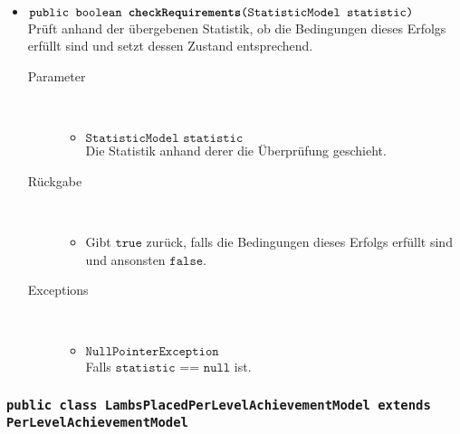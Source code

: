 \begin{description}
\begin{itemize}
		\item $\texttt{public boolean \textbf{checkRequirements}(StatisticModel statistic)}$ \\ Prüft anhand der übergebenen Statistik, ob die Bedingungen dieses Erfolgs erfüllt sind und setzt dessen Zustand entsprechend.
		\begin{description}
		\item[Parameter] \hfill \\
			\vspace{-.8cm}
			\begin{itemize}
				\item $\texttt{StatisticModel statistic}$ \\ Die Statistik anhand derer die Überprüfung geschieht. 
			\end{itemize}
			\item[Rückgabe] \hfill \\
			\vspace{-.8cm}
			\begin{itemize}
				\item Gibt $\texttt{true}$ zurück, falls die Bedingungen dieses Erfolgs erfüllt sind und ansonsten $\texttt{false}$.
			\end{itemize}
			\item[Exceptions] \hfill \\
			\vspace{-.8cm}
			\begin{itemize}
				\item $\texttt{NullPointerException}$ \\ Falls $\texttt{statistic == null}$ ist.
			\end{itemize}
		\end{description}
	\end{itemize}
\end{description}

\subsubsection{\normalfont \texttt{public class \textbf{LambsPlacedPerLevelAchievementModel} extends PerLevelAchievementModel}}

